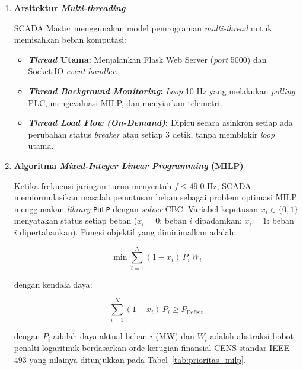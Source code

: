 \begin{enumerate} 
\item[a.] \textbf{Arsitektur \textit{Multi-threading}}

SCADA Master menggunakan model pemrograman \textit{multi-thread} untuk memisahkan beban komputasi:

\begin{itemize}
    \item[i.] \textbf{\textit{Thread} Utama:} Menjalankan Flask Web Server (\textit{port} 5000) dan Socket.IO \textit{event handler}.
    \item[ii.] \textbf{\textit{Thread Background Monitoring}:} \textit{Loop} 10 Hz yang melakukan \textit{polling} PLC, mengevaluasi MILP, dan menyiarkan telemetri.
    \item[iii.] \textbf{\textit{Thread Load Flow (On-Demand)}:} Dipicu secara asinkron setiap ada perubahan status \textit{breaker} atau setiap 3 detik, tanpa memblokir \textit{loop} utama.
\end{itemize}

\item[b.] \textbf{Algoritma \textit{Mixed-Integer Linear Programming} (MILP)}

Ketika frekuensi jaringan turun menyentuh $f \leq 49{.}0$ Hz, SCADA memformulasikan masalah pemutusan beban sebagai problem optimasi MILP menggunakan \textit{library} \texttt{PuLP} dengan \textit{solver} CBC.
Variabel keputusan $x_i \in \{0, 1\}$ menyatakan status setiap beban ($x_i = 0$: beban $i$ dipadamkan; $x_i = 1$: beban $i$ dipertahankan). Fungsi objektif yang diminimalkan adalah:

\begin{equation}
    \min \sum_{i=1}^{N} (1 - x_i)\, P_i\, W_i
    \label{eq:milp_obj}
\end{equation}

\noindent dengan kendala daya:

\begin{equation}
    \sum_{i=1}^{N} (1 - x_i)\, P_i \geq P_{\mathrm{Defisit}}
    \label{eq:milp_const}
\end{equation}

\noindent dengan $P_i$ adalah daya aktual beban $i$ (MW) dan $W_i$ adalah abstraksi bobot penalti logaritmik berdasarkan orde kerugian finansial CENS standar IEEE 493 yang nilainya ditunjukkan pada Tabel~\ref{tab:prioritas_milp}.


\end{enumerate}
